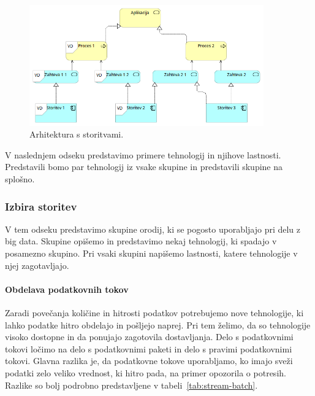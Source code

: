 \begin{figure}[H]
    \centering
    \includegraphics[width=0.9\textwidth]{img/gradnja/generic-services.png}
    \caption{Arhitektura s storitvami.}
    \label{fig:generic-services}
\end{figure}

V naslednjem odseku predstavimo primere tehnologij in njihove lastnosti.
Predstavili bomo par tehnologij iz vsake skupine in predstavili skupine na splošno.

\subsubsection{Izbira storitev}
V tem odseku predstavimo skupine orodij,
ki se pogosto uporabljajo pri delu z big data.
Skupine opišemo in predstavimo nekaj tehnologij,
ki spadajo v posamezno skupino.
Pri vsaki skupini napišemo lastnosti, katere tehnologije v njej zagotavljajo.

\paragraph{Obdelava podatkovnih tokov}
Zaradi povečanja količine in hitrosti podatkov potrebujemo nove tehnologije,
ki lahko podatke hitro obdelajo in pošljejo naprej.
Pri tem želimo, da so tehnologije visoko dostopne in da ponujajo zagotovila dostavljanja.
Delo s podatkovnimi tokovi ločimo na delo s
podatkovnimi paketi in delo s pravimi podatkovnimi tokovi.
Glavna razlika je, da podatkovne tokove uporabljamo,
ko imajo sveži podatki zelo veliko vrednost, ki hitro pada,
na primer opozorila o potresih.
Razlike so bolj podrobno predstavljene v tabeli~\ref{tab:stream-batch}.

